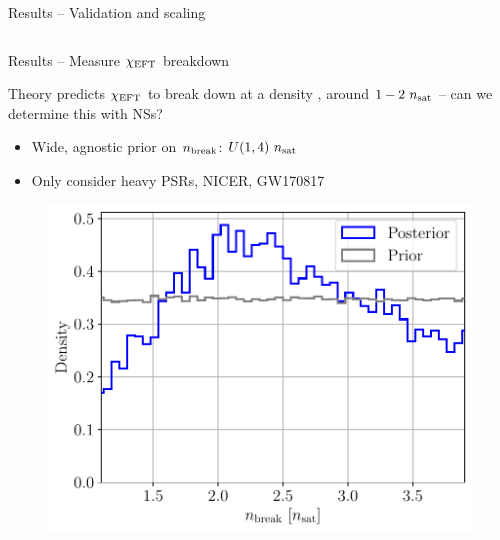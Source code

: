 \documentclass[usenames,dvipsnames,t]{beamer}
\begin{document}
\begin{frame}{Results -- Validation and scaling}
\begin{columns}
  \end{columns}

\end{frame}


\begin{frame}{Results -- Measure $\chi_{\rm{EFT}}$ breakdown}

  \def\x{2mm}
  \def\y{2mm}

  Theory predicts $\chi_{\rm{EFT}}$ to break down at a density , around $1-2 \ n_{\rm{sat}}$ -- can we determine this with NSs?

  \begin{itemize}
    \vspace{\y}
    \item Wide, agnostic prior on $n_{\rm{break}}$: $U(1, 4) \ n_{\rm{sat}}$

    \vspace{\y}
    \item Only consider heavy PSRs, NICER, GW170817

  \end{itemize}

  \vspace{\x}

  \begin{figure}
    \centering
    \includegraphics[width=0.55\linewidth]{Figures/nbreak_posterior.pdf}
  \end{figure}

\end{frame}
\end{document}
